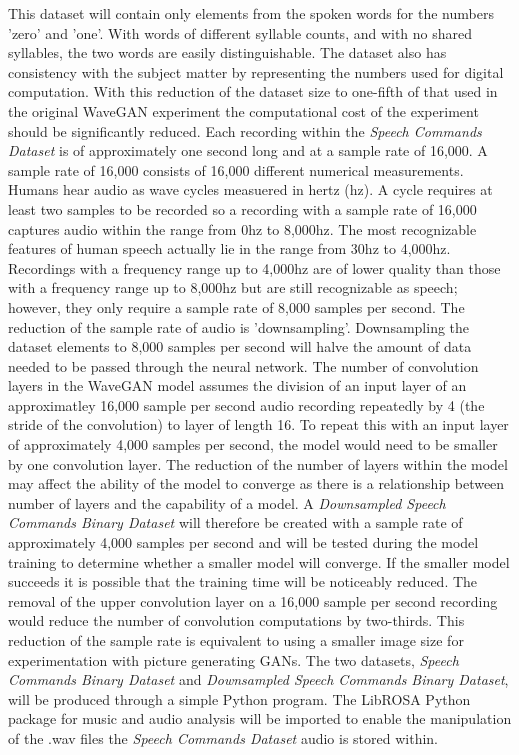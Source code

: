 \documentclass[a4paper, titlepage]{article}
\begin{document}
This dataset will contain only elements from the spoken words for the numbers 'zero' and 'one'.
With words of different syllable counts, and with no shared syllables, the two words are easily distinguishable.
The dataset also has consistency with the subject matter by representing the numbers used for digital computation.
With this reduction of the dataset size to one-fifth of that used in the original WaveGAN experiment the computational cost of the experiment should be significantly reduced.
\newline
\newline
Each recording within the \textit{Speech Commands Dataset} is of approximately one second long and at a sample rate of 16,000.
A sample rate of 16,000 consists of 16,000 different numerical measurements.
Humans hear audio as wave cycles measuered in hertz (hz).
A cycle requires at least two samples to be recorded so a recording with a sample rate of 16,000 captures audio within the range from 0hz to 8,000hz.
The most recognizable features of human speech actually lie in the range from 30hz to 4,000hz.
Recordings with a frequency range up to 4,000hz are of lower quality than those with a frequency range up to 8,000hz but are still recognizable as speech; however, they only require a sample rate of 8,000 samples per second.
\newline
\newline
The reduction of the sample rate of audio is 'downsampling'.
Downsampling the dataset elements to 8,000 samples per second will halve the amount of data needed to be passed through the neural network.
The number of convolution layers in the WaveGAN model assumes the division of an input layer of an approximatley 16,000 sample per second audio recording repeatedly by 4 (the stride of the convolution) to layer of length 16.
To repeat this with an input layer of approximately 4,000 samples per second, the model would need to be smaller by one convolution layer.
The reduction of the number of layers within the model may affect the ability of the model to converge as there is a relationship between number of layers and the capability of a model.
\newline
\newline
A \textit{Downsampled Speech Commands Binary Dataset} will therefore be created with a sample rate of approximately 4,000 samples per second and will be tested during the model training to determine whether a smaller model will converge.
If the smaller model succeeds it is possible that the training time will be noticeably reduced.
The removal of the upper convolution layer on a 16,000 sample per second recording would reduce the number of convolution computations by two-thirds.
This reduction of the sample rate is equivalent to using a smaller image size for experimentation with picture generating GANs.
\newline
\newline
The two datasets, \textit{Speech Commands Binary Dataset} and \textit{Downsampled Speech Commands Binary Dataset}, will be produced through a simple Python program.
The LibROSA Python package for music and audio analysis will be imported to enable the manipulation of the .wav files the \textit{Speech Commands Dataset} audio is stored within.
\end{document}
